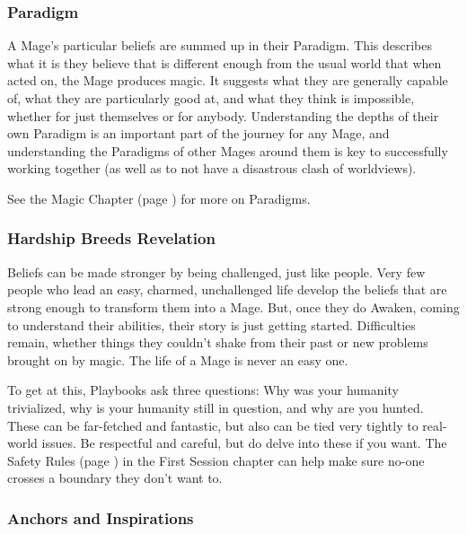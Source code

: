 \documentclass[
]{article}
\begin{document}
\hypertarget{paradigm}{%
\subsubsection{Paradigm}\label{paradigm}}

A Mage's particular beliefs are summed up in their Paradigm. This
describes what it is they believe that is different enough from the
usual world that when acted on, the Mage produces magic. It suggests
what they are generally capable of, what they are particularly good at,
and what they think is impossible, whether for just themselves or for
anybody. Understanding the depths of their own Paradigm is an important
part of the journey for any Mage, and understanding the Paradigms of
other Mages around them is key to successfully working together (as well
as to not have a disastrous clash of worldviews).

See the Magic Chapter (page \pageref{Magic Chapter}) for more on Paradigms.

\hypertarget{hardship-breeds-revelation}{%
\subsubsection{Hardship Breeds
Revelation}\label{hardship-breeds-revelation}}

Beliefs can be made stronger by being challenged, just like people. Very
few people who lead an easy, charmed, unchallenged life develop the
beliefs that are strong enough to transform them into a Mage. But, once
they do Awaken, coming to understand their abilities, their story is
just getting started. Difficulties remain, whether things they couldn't
shake from their past or new problems brought on by magic. The life of a
Mage is never an easy one.

To get at this, Playbooks ask three questions: Why was your humanity trivialized, why is your humanity still in question, and why are you hunted. These can be far-fetched and fantastic, but also can be tied very tightly to real-world issues. Be respectful and careful, but do delve into these if you want. The Safety Rules (page \pageref{Safety Rules}) in the First Session chapter can help make sure no-one crosses a boundary they don’t want to.

\hypertarget{anchors-and-inspirations}{%
\subsubsection{Anchors and
Inspirations}\label{anchors-and-inspirations}}
\end{document}
